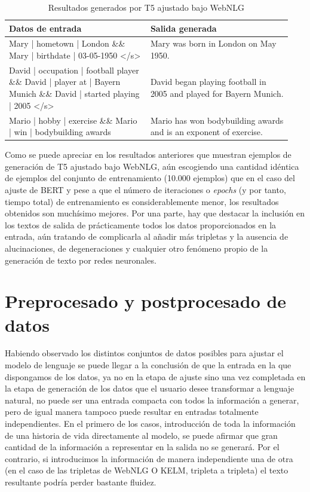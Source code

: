\begin{table}[h!]
    \begin{center}
    \begin{tabular}{p{0.47\linewidth} | p{0.47\linewidth}}
    
    \textbf{Datos de entrada} & \textbf{Salida generada} \\ \hline
    
    Mary | hometown | London \&\& Mary | birthdate | 03-05-1950 </s> & Mary was born in London on May 1950. \\ \hline
    David | occupation | football player \&\& David | player at | Bayern Munich \&\& David | started playing | 2005 </s> & David began playing football in 2005 and played for Bayern Munich. \\ \hline
    
    Mario | hobby | exercise \&\& Mario | win | bodybuilding awards & Mario has won bodybuilding awards and is an exponent of exercise.
    \end{tabular}
    \caption{Resultados generados por T5 ajustado bajo WebNLG }
    \label{tab:webnlg_t5_resultados}
    \end{center}
\end{table}

Como se puede apreciar en los resultados anteriores que muestran ejemplos de generación de T5 ajustado bajo WebNLG, aún escogiendo una cantidad idéntica de ejemplos del conjunto de entrenamiento (10.000 ejemplos) que en el caso del ajuste de BERT y pese a que el número de iteraciones o \textit{epochs} (y por tanto, tiempo total) de entrenamiento es considerablemente menor, los resultados obtenidos son muchísimo mejores. Por una parte, hay que destacar la inclusión en los textos de salida de prácticamente todos los datos proporcionados en la entrada, aún tratando de complicarla al añadir más tripletas y la ausencia de alucinaciones, de degeneraciones y cualquier otro fenómeno propio de la generación de texto por redes neuronales. 

\section{Preprocesado y postprocesado de datos}

Habiendo observado los distintos conjuntos de datos posibles para ajustar el modelo de lenguaje se puede llegar a la conclusión de que la entrada en la que dispongamos de los datos, ya no en la etapa de ajuste sino una vez completada en la etapa de generación de los datos que el usuario desee transformar a lenguaje natural, no puede ser una entrada compacta con todos la información a generar, pero de igual manera tampoco puede resultar en entradas totalmente independientes. En el primero de los casos, introducción de toda la información de una historia de vida directamente al modelo, se puede afirmar que gran cantidad de la información a representar en la salida no se generará. Por el contrario, si introducimos la información de manera independiente una de otra (en el caso de las tripletas de WebNLG O KELM, tripleta a tripleta) el texto resultante podría perder bastante fluidez.

